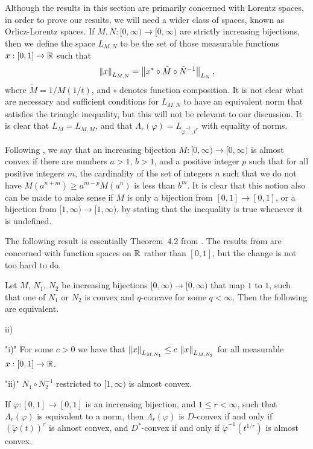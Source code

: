 \endhead
%
Although the results in this section are primarily concerned with
Lorentz spaces, in order to prove our results, we will need a wider
class of spaces, known as Orlicz-Lorentz
spaces.  If $M,N:[0,\infty) \to [0,\infty)$ are strictly increasing
bijections, then we define the space $L_{M,N}$ to be the set of those
measurable
functions $x:[0,1]\to {\Bbb R}$ such that
$$ \left\|x\right\|_{L_{M,N}}
   = \left\|x^*\circ \tilde M \circ \tilde N^{-1}\right\|_{L_N} ,$$
where $\tilde M = 1/M(1/t)$, and $\circ$ denotes function composition.
It is not clear what are necessary and sufficient conditions for
$L_{M,N}$ to have an equivalent norm that satisfies the triangle inequality,
but this will not be relevant to our discussion.  It is clear that
$L_M = L_{M,M}$, and that $\Lambda_r(\varphi) = L_{\tilde \varphi^{-1},t^r}$
with equality of norms.

Following \cite{M1}, we say that an increasing bijection $M:[0,\infty) \to
[0,\infty)$ is almost convex if there are numbers
$a>1$, $b>1$, and a positive integer $p$ such that for all positive integers
$m$, the cardinality of the set of integers $n$ such that we do not have
$M(a^{n+m}) \ge a^{m-p} M(a^n)$
is less than $b^m$.  It is clear that this notion also can be made to
make sense if
$M$ is only a bijection from $[0,1] \to [0,1]$, or a bijection from
$[1,\infty) \to [1,\infty)$, by stating that the inequality is true
whenever it is undefined.

The following result is essentially Theorem~4.2 from \cite{M1}.  The results
from \cite{M1} are concerned with function spaces on ${\Bbb R}$ rather than
$[0,1]$, but the change is not too hard to do.

  Let $M$, $N_1$, $N_2$ be increasing
bijections $[0,\infty)\to[0,\infty)$ that map $1$ to $1$,
such that one of $N_1$ or $N_2$ is convex and $q$-concave for some
$q<\infty$.
Then the following are
equivalent.
\roster\widestnumber\item{ii)}
\item"{i)}" For some $c>0$ we have that
$\left\|x\right\|_{L_{M,N_1}} \le c \, \left\|x\right\|_{L_{M,N_2}}$ for all
measurable $x:[0,1] \to {\Bbb R}$.
\item"{ii)}" $N_1 \circ N_2^{-1}$ restricted to $[1,\infty)$ is almost
convex.
\endroster
\endproclaim

  If $\varphi:[0,1] \to [0,1]$ is an increasing
bijection, and $1 \le r < \infty$, such that $\Lambda_r(\varphi)$ is
equivalent to a norm, then $\Lambda_r(\varphi)$ is $D$-convex if and
only if $(\tilde \varphi(t))^r$ is almost convex, and $D^*$-convex
if and only if
$\tilde\varphi^{-1}(t^{1/r})$ is almost convex.
\endproclaim

